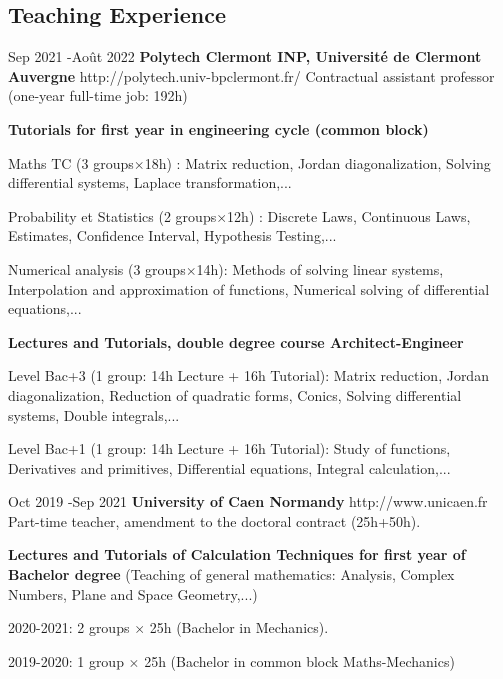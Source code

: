 \documentclass[10pt]{article} %
\begin{document}
\subsection{Teaching Experience}
\job
{Sep 2021 -}{Août 2022}
{\textbf{Polytech Clermont INP, Université de Clermont Auvergne}}
{http://polytech.univ-bpclermont.fr/}
{Contractual assistant professor (one-year full-time job: 192h)}
{
	\begin{itemize-noindent}
		\item{	\textbf{Tutorials for first year in engineering cycle (common block)}}
		\begin{itemize-noindent}
			\item{ Maths TC (3 groups$\times$18h) : Matrix reduction, Jordan diagonalization, Solving differential systems, Laplace transformation,... }
			\item{ Probability et Statistics (2 groups$\times$12h) : Discrete Laws, Continuous Laws, Estimates, Confidence Interval, Hypothesis Testing,...}
         \item{ Numerical analysis (3 groups$\times$14h): Methods of solving linear systems, Interpolation and approximation of functions, Numerical solving of differential equations,...}
		\end{itemize-noindent}
    \item{ \textbf{Lectures and Tutorials, double degree course Architect-Engineer}}
		\begin{itemize-noindent}
\item{Level Bac+3 (1 group: 14h Lecture + 16h Tutorial): Matrix reduction, Jordan diagonalization, Reduction of quadratic forms, Conics, Solving differential systems, Double integrals,... }
\item{Level Bac+1 (1 group: 14h Lecture + 16h Tutorial): Study of functions, Derivatives and primitives, Differential equations, Integral calculation,... }
		\end{itemize-noindent}	
\end{itemize-noindent}
}

\job
{Oct 2019 -}{Sep 2021}
{\textbf{University  of Caen Normandy}}
{http://www.unicaen.fr}
{Part-time teacher, amendment to the doctoral contract (25h+50h).}
{\begin{itemize-noindent}
\item{\textbf{Lectures and Tutorials of Calculation Techniques for first year of Bachelor degree} (Teaching of general mathematics: Analysis, Complex Numbers, Plane and Space Geometry,...)}
	\begin{itemize-noindent}
\item{2020-2021: 2 groups $\times$ 25h (Bachelor in Mechanics).}
\item{2019-2020: 1 group $\times$ 25h (Bachelor in common block Maths-Mechanics)}
	\end{itemize-noindent}
\end{itemize-noindent}}
\end{document}
